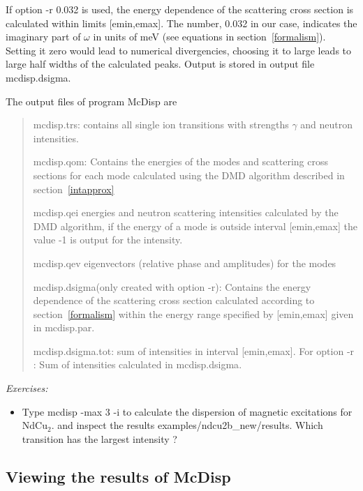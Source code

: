 If option {\prg -r 0.032} is used, the energy dependence of 
the scattering cross section is calculated within limits [emin,emax].
The number, 0.032 in our case, indicates the imaginary part of $\omega$ 
in units of meV (see equations
in section~\ref{formalism}). Setting it zero would lead to numerical
divergencies, choosing it to large leads to large half widths of the calculated 
peaks. 
 Output
is stored in output file {\prg mcdisp.dsigma}.

The output files of program {\prg McDisp} are 

\begin{quote}
\item[{\prg mcdisp.trs}:] contains all single ion transitions with strengths $\gamma$ 
and neutron intensities.
\item [{\prg mcdisp.qom}:] Contains the energies of the modes and scattering cross sections  for each mode 
calculated using the DMD algorithm described in section~\ref{intapprox}
\item[{\prg mcdisp.qei}] energies and neutron scattering intensities calculated by the DMD algorithm, if 
        the energy of a mode is outside interval  [emin,emax] the value -1 is output for the intensity.
\item[{\prg mcdisp.qev}] eigenvectors (relative phase and amplitudes) for the modes
\item [{\prg mcdisp.dsigma}(only created with option {\prg -r}):] Contains the energy dependence of the scattering cross %
section
calculated according to section~\ref{formalism} within the energy range specified by [emin,emax] given in {\prg %
mcdisp.par}. 
\item [{\prg mcdisp.dsigma.tot}:] sum of intensities in interval  [emin,emax].  For option {\prg -r} : Sum of intensities calculated in {\prg %
mcdisp.dsigma}.
\end{quote}

\vspace{1cm}
{\em Exercises:}
\begin{itemize}
\item Type {\prg mcdisp -max 3 -i} to
calculate the dispersion of magnetic excitations for NdCu$_2$.
and inspect the results
{\prg examples/ndcu2b\_new/results}.
Which  transition has the largest intensity ?
\end{itemize}

\subsection{Viewing the results of McDisp}

